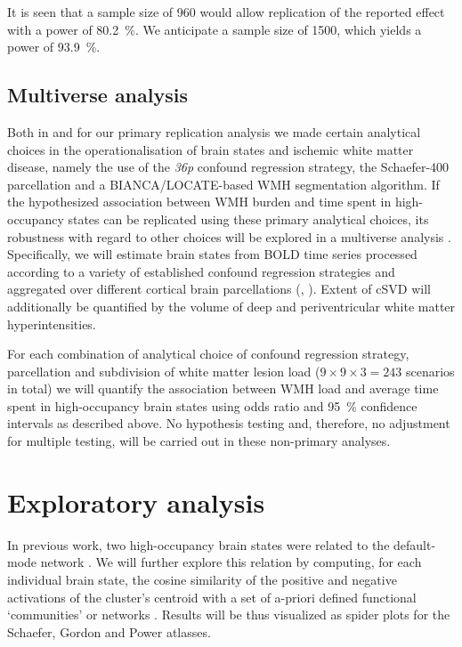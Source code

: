It is seen that a sample size of \num{960} would allow replication of the reported effect with a power of \qty{80.2}{\percent}.
We anticipate a sample size of \num{1500}, which yields a power of \qty{93.9}{\percent}.


\subsection{Multiverse analysis}
Both in \citep{Schlemm2022-he} and for our primary replication analysis we made certain analytical choices in the operationalisation of brain states and ischemic white matter disease, namely the use of the \textit{36p} confound regression strategy, the Schaefer-\num{400} parcellation and a BIANCA/LOCATE-based WMH segmentation algorithm.
If the hypothesized association between WMH burden and time spent in high-occupancy states can be replicated using these primary analytical choices, its robustness with regard to other choices will be explored in a multiverse analysis \citep{Schlemm2022-he,Steegen2016-ze}.
Specifically, we will estimate brain states from BOLD time series processed according to a variety of established confound regression strategies and aggregated over different cortical brain parcellations (, \cite{ciric2018mitigating,Ciric2017-cl}). Extent of cSVD will additionally be quantified by the volume of deep and periventricular white matter hyperintensities.



For each combination of analytical choice of confound regression strategy, parcellation and subdivision of white matter lesion load ($9\times9\times3=243$ scenarios in total) we will quantify the association between WMH load and average time spent in high-occupancy brain states using odds ratio and \qty{95}{\percent} confidence intervals as described above.
No hypothesis testing and, therefore, no adjustment for multiple testing, will be carried out in these non-primary analyses.

\section{Exploratory analysis}
In previous work, two high-occupancy brain states were related to the default-mode network \citep{Cornblath2020-fu}.
We will further explore this relation by computing, for each individual brain state, the cosine similarity of the positive and negative activations of the cluster’s centroid with a set of a-priori defined functional ‘communities’ or networks \citep{Schaefer2018-bo,Yeo2011-qg}.
Results will be thus visualized as spider plots for the Schaefer, Gordon and Power atlasses.

